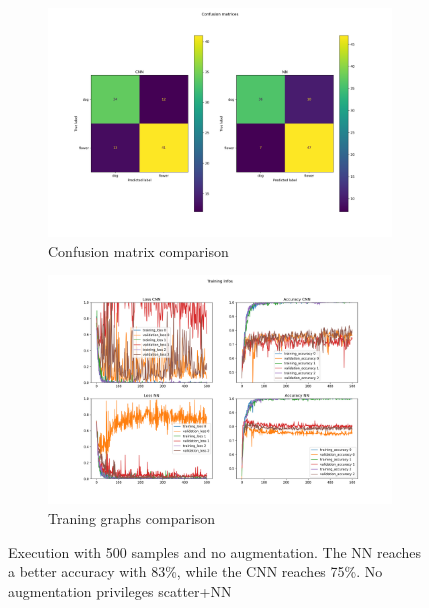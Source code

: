 \documentclass{report}
\begin{document}
\begin{figure}[t!]
  \centering
  \hspace{-2cm}
  \begin{subfigure}[t]{0.49\textwidth}
    \centering
    \includegraphics[width=1.3\textwidth]{8.500_noaug/conf_mat.png}
    \caption{Confusion matrix comparison}
    \label{fig:image-set5-sub1}
  \end{subfigure}
  \hfill
  \begin{subfigure}[t]{0.49\textwidth}
    \centering
    \includegraphics[width=1.3\textwidth]{8.500_noaug/training_infos.png}
    \caption{Traning graphs comparison}
    \label{fig:image-set5-sub2}
  \end{subfigure}

  \caption{Execution with 500 samples and no augmentation. The NN reaches a better accuracy with 83\%, while the CNN reaches 75\%. No augmentation privileges scatter+NN}
  \label{fig:image-set5}
\end{figure}
\end{document}
